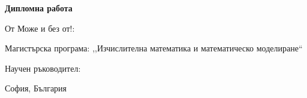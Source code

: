 \begin{titlepage}
    \thispagestyle{fancy}
    \begin{center}
        \hfill \break
        \hfill \break
        \hfill \break
        \Huge	
        \textbf{Дипломна работа}\\
        \@title
        \vspace{3cm}
    \end{center}
    \normalsize	
    \title{}
    \vspace{2cm}

    \begin{flushright}
        \normalsize	
        От Може и без от!: \@author
        
        Магистърска програма: ,,Изчислителна математика и математическо моделиране``
        \vspace{1cm}

        Научен ръководител:

        \VT
    \end{flushright}

    \vspace*{\fill}
    \begin{center}
        \footnotesize	
        София, България\\
         ~\@date~
    \end{center}
 \end{titlepage}
